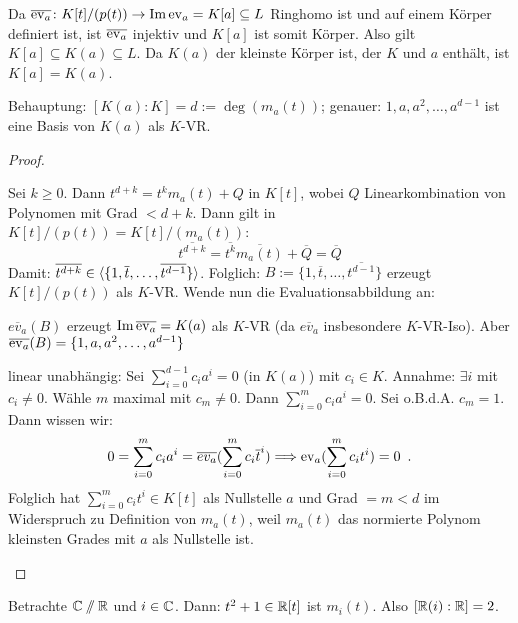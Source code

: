 \documentclass[12pt,a4paper]{scrartcl}
\begin{document}
\begin{description}
	Da $\overline{\operatorname{ev}_a}\colon K[t]/(p(t))\to \operatorname{Im}\operatorname{ev}_a = K[a]\subseteq L$ Ringhomo ist und auf einem Körper definiert ist, ist $\overline{\operatorname{ev}_a}$ injektiv und $K[a]$ ist somit Körper. Also gilt $K[a]\subseteq K(a) \subseteq L$. Da $K(a)$ der kleinste Körper ist, der $K$ und $a$ enthält, ist $K[a] = K(a)$.
	
	Behauptung: $[K(a):K] = d := \deg(m_a(t))$; genauer: $1, a, a^2,\dots, a^{d-1}$ ist eine Basis von $K(a)$ als $K$-VR.
	\begin{proof}
		\leavevmode
		\begin{description}
			\item[Erzeugendensystem:] Sei $k\geq 0$. Dann $t^{d+k} = t^km_a(t)+Q$ in $K[t]$, wobei $Q$ Linearkombination von Polynomen mit Grad $<d+k$. Dann gilt in $K[t]/(p(t)) = K[t]/(m_a(t))$:
			$$\overline{t^{d+k}} = \overline{t^k}\overline{m_a(t)} + \overline{Q} = \overline{Q}$$
			Damit: $\overline{t^{d+k}} \in \langle \{1, \overline{t}, \dots, \overline{t^{d-1}}\}\rangle$. Folglich: $B :=  \{1, \overline{t}, \dots, \overline{t^{d-1}}\}$ erzeugt $K[t]/(p(t))$ als $K$-VR. Wende nun die Evaluationsabbildung an:
			
			$\overline{ev_a}(B)$ erzeugt $\operatorname{Im}\overline{\operatorname{ev}_a} = K(a)$ als $K$-VR (da $\overline{ev_a}$ insbesondere $K$-VR-Iso). Aber $\overline{\operatorname{ev}_a}(B) = \{1, a, a^2,\dots, a^{d-1}\}$
			\item{linear unabhängig:} Sei $\sum_{i =0}^{d-1}c_ia^i = 0$ (in $K(a)$) mit $c_i\in K$. Annahme: $\exists i$ mit $c_i \neq 0$. Wähle $m$ maximal mit $c_m \neq 0$. Dann $\sum_{i = 0}^{m}c_ia^i = 0$. Sei o.B.d.A. $c_m = 1$. Dann wissen wir:
			$$0 = \sum_{i = 0}^m c_ia^i = \overline{ev_a}(\sum_{i=0}^mc_i\overline{t}^i)\Longrightarrow \operatorname{ev}_a(\sum_{i=0}^m c_it^i) = 0\enspace .$$
			Folglich hat $\sum_{i=0}^mc_it^i\in K[t]$ als Nullstelle $a$ und Grad $= m <d$ im Widerspruch zu Definition von $m_a(t)$, weil $m_a(t)$ das normierte Polynom kleinsten Grades mit $a$ als Nullstelle ist.
		\end{description}
	\end{proof}
\end{description}

\begin{bsp}
	Betrachte $\mathbb C\sslash\mathbb R$ und $i\in\mathbb C$. Dann: $t^2+1\in \mathbb R[t]$ ist $m_i(t)$. Also $[\mathbb R(i):\mathbb R] = 2$. %
\end{bsp}
\end{document}

